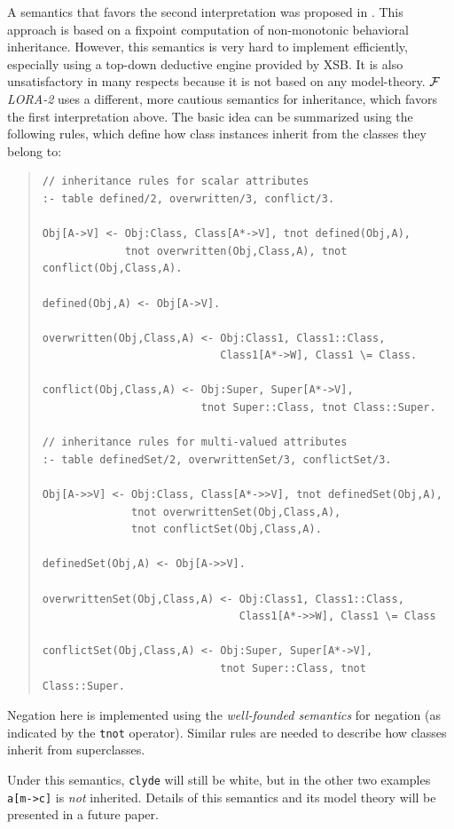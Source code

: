\documentclass[11pt]{article}
\newcommand{\FLORA}{{\mbox{${\cal F}${\small\it LORA}\rm\emph{-2}}}\xspace}
\begin{document}
A semantics that favors the second interpretation was proposed in
\cite{KLW95}. This approach is based on a fixpoint computation of
non-monotonic behavioral inheritance.  However, this semantics is very hard
to implement efficiently, especially using a top-down deductive engine
provided by XSB. It is also unsatisfactory in many respects because it is
not based on any model-theory. \FLORA uses a different, more cautious
semantics for inheritance, which favors the first interpretation above.
The basic idea can be summarized using the following rules, which define how
class instances inherit from the classes they belong to:
\begin{quote}
\begin{verbatim}
// inheritance rules for scalar attributes
:- table defined/2, overwritten/3, conflict/3.

Obj[A->V] <- Obj:Class, Class[A*->V], tnot defined(Obj,A),
             tnot overwritten(Obj,Class,A), tnot conflict(Obj,Class,A).

defined(Obj,A) <- Obj[A->V].

overwritten(Obj,Class,A) <- Obj:Class1, Class1::Class,
                            Class1[A*->W], Class1 \= Class.

conflict(Obj,Class,A) <- Obj:Super, Super[A*->V],
                         tnot Super::Class, tnot Class::Super.

// inheritance rules for multi-valued attributes
:- table definedSet/2, overwrittenSet/3, conflictSet/3.

Obj[A->>V] <- Obj:Class, Class[A*->>V], tnot definedSet(Obj,A),
              tnot overwrittenSet(Obj,Class,A),
              tnot conflictSet(Obj,Class,A).

definedSet(Obj,A) <- Obj[A->>V].

overwrittenSet(Obj,Class,A) <- Obj:Class1, Class1::Class,
                               Class1[A*->>W], Class1 \= Class

conflictSet(Obj,Class,A) <- Obj:Super, Super[A*->V],
                            tnot Super::Class, tnot Class::Super.
\end{verbatim}
\end{quote}
Negation here is implemented using the {\em well-founded semantics}
for negation \cite{gelder-alternating-89,gelder-ross-schlipf-91} (as
indicated by the {\tt tnot} operator).  Similar rules are needed to
describe how classes inherit from superclasses.

Under this semantics, {\tt clyde} will still be white, but in the other two
examples {\tt a[m->c]} is \emph{not} inherited. Details of this semantics
and its model theory will be presented in a future paper.
\end{document}
